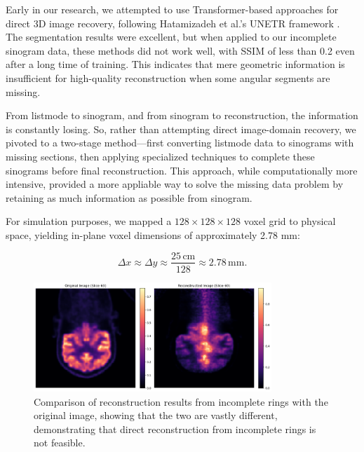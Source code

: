 \documentclass[
reprint,
superscriptaddress,
nofootinbib,
amsmath,amssymb,
aps,
prd,
]{revtex4-2}
\begin{document}
Early in our research, we attempted to use Transformer-based approaches for direct 3D image recovery, following Hatamizadeh et al.'s UNETR framework \cite{hatamizadeh2021unetrtransformers3dmedical}. The segmentation results were excellent, but when applied to our incomplete sinogram data, these methods did not work well, with SSIM of less than 0.2 even after a long time of training. This indicates that mere geometric information is insufficient for high-quality reconstruction when some angular segments are missing. 



From listmode to sinogram, and from sinogram to reconstruction, the information is constantly losing. So, rather than attempting direct image-domain recovery, we pivoted to a two-stage method—first converting listmode data to sinograms with missing sections, then applying specialized techniques to complete these sinograms before final reconstruction. This approach, while computationally more intensive, provided a more appliable way to solve the missing data problem by retaining as much information as possible from sinogram.



For simulation purposes, we mapped a $128\times128\times128$ voxel grid to physical space, yielding in-plane voxel dimensions of approximately 2.78 mm:

\begin{equation}
\Delta x \approx \Delta y \approx \frac{25\,\text{cm}}{128} \approx 2.78\,\text{mm}.
\end{equation}

\begin{figure}[htbp]
    \centering
    \vspace{-0.2cm}
    \includegraphics[width=0.8\textwidth]{Images/output2}
    \vspace{-0.2cm}
    \caption{Comparison of reconstruction results from incomplete rings with the original image, showing that the two are vastly different, demonstrating that direct reconstruction from incomplete rings is not feasible.}
    \vspace{-0.2cm}
    \label{fig:pet_incomplete_reconstruction}
\end{figure}
\end{document}
